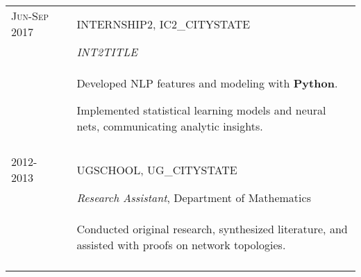 \documentclass[a4paper,10pt]{article}
\begin{document}
\begin{supertabular}{l p{0.55cm} p{13.9cm}}
	\textsc{Jun-Sep 2017}	&& \textsc{INTERNSHIP2}, IC2_CITYSTATE \\
												&& \small	\emph{INT2TITLE} \\
												&& \begin{enumerate*}[label =$\diamond$, itemjoin={\newline}]
														\item \footnotesize Developed NLP features and modeling with $\mathbf{Python}$.
														\item \footnotesize Implemented statistical learning models and neural nets, communicating analytic insights. \end{enumerate*} \\
	 \\
	


	\textsc{2012-2013}		&& \textsc{UGSCHOOL}, UG_CITYSTATE \\
	\textsc{}							&& \small	\emph{Research Assistant}, Department of Mathematics \\
												&& \begin{enumerate*}[label =$\diamond$, itemjoin={\newline}]
														\item \footnotesize Conducted original research, synthesized literature, and assisted with proofs on network topologies.
														\end{enumerate*} \\
	 \\


\end{supertabular}





\end{document}

